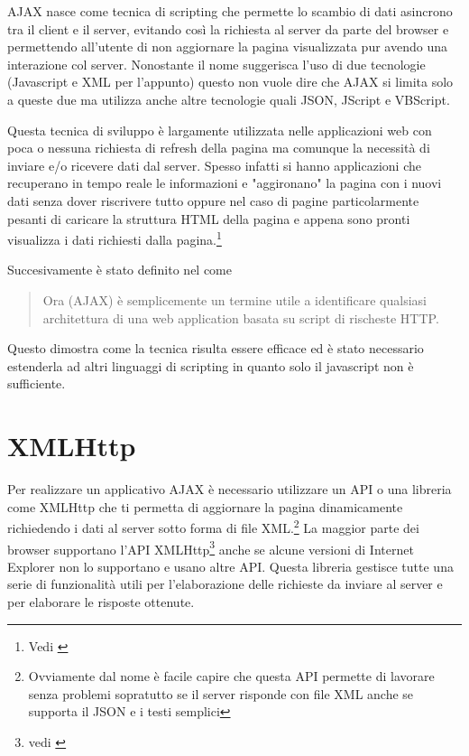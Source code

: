\documentclass[a4paper,12pt]{report}
\begin{document}
AJAX nasce come tecnica di scripting che permette lo scambio di dati asincrono tra il client e il server, evitando così la richiesta al server da parte del browser e permettendo all'utente di non aggiornare la pagina visualizzata pur avendo una interazione col server. Nonostante il nome suggerisca l'uso di due tecnologie (Javascript e XML per l'appunto) questo non vuole dire che AJAX si limita solo a queste due ma utilizza anche altre tecnologie quali JSON, JScript e VBScript.

Questa tecnica di sviluppo è largamente utilizzata nelle applicazioni web con poca o nessuna richiesta di refresh della pagina ma comunque la necessità di inviare e/o ricevere dati dal server. Spesso infatti si hanno applicazioni che recuperano in tempo reale le informazioni e "aggironano" la pagina con i nuovi dati senza dover riscrivere tutto oppure nel caso di pagine particolarmente pesanti di caricare la struttura HTML della pagina e appena sono pronti visualizza i dati richiesti dalla pagina.\footnote{Vedi \cites{flanaganjavascript} }

Succesivamente è stato definito nel \textcites[pag~491]{flanaganjavascript} come 
\begin{quotation}
Ora (AJAX) è semplicemente un termine utile a identificare qualsiasi architettura di una web application basata su script di rischeste HTTP.
\end{quotation}

Questo dimostra come la tecnica risulta essere efficace ed è stato necessario estenderla ad altri linguaggi di scripting in quanto solo il javascript non è sufficiente.

\section{XMLHttp} Per realizzare un applicativo AJAX è necessario utilizzare un API o una libreria come XMLHttp che ti permetta di aggiornare la pagina dinamicamente richiedendo i dati al server sotto forma di file XML.\footnote{Ovviamente dal nome è facile capire che questa API permette di lavorare senza problemi sopratutto se il server risponde con file XML anche se supporta il JSON e i testi semplici} 
La maggior parte dei browser supportano l'API XMLHttp\footnote{vedi \textcites{site:xmlhttpcompatibilita}} anche se alcune versioni di Internet Explorer non lo supportano e usano altre API.
Questa libreria gestisce tutte una serie di funzionalità utili per l'elaborazione delle richieste da inviare al server e per elaborare le risposte ottenute.
\end{document}
